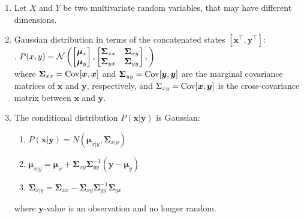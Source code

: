 \begin{enumerate}
    \item Let $X$ and $Y$ be two multivariate random variables, that may have different dimensions.
    \hfill \cite{mfml/book/mml/Deisenroth-Faisal-Ong}

    \item Gaussian distribution in terms of the concatenated states $[\bm{x}^\top, \bm{y}^\top]$:
    \hfill \cite{mfml/book/mml/Deisenroth-Faisal-Ong}
    \\[0.2cm]
    .\hfill
    $
        P(x, y)
        = \mathcal{N}\left(
            \begin{bmatrix}
                \bm{\mu}_x \\ \bm{\mu}_y
            \end{bmatrix},
            \begin{bmatrix}
                \bm{\Sigma}_{xx} & \bm{\Sigma}_{xy} \\ 
                \bm{\Sigma}_{yx} & \bm{\Sigma}_{yy} \\ 
            \end{bmatrix},
        \right)
    $
    \hfill \cite{mfml/book/mml/Deisenroth-Faisal-Ong}
    \\[0.2cm]
    where $\bm{\Sigma}_{xx} = \text{Cov}[\bm{x}, \bm{x}]$ and $\bm{\Sigma}_{yy} = \text{Cov}[\bm{y}, \bm{y}]$ are the marginal covariance matrices of $\bm{x}$ and $\bm{y}$, respectively, and $\Sigma_{xy} = \text{Cov}[\bm{x}, \bm{y}]$ is the cross-covariance matrix between $\bm{x}$ and $\bm{y}$.
    \hfill \cite{mfml/book/mml/Deisenroth-Faisal-Ong}

    \item The conditional distribution $P(\bm{x} | \bm{y})$ is Gaussian:
    \hfill \cite{mfml/book/mml/Deisenroth-Faisal-Ong}
    \begin{multicols}{2}
    \begin{enumerate}
        \item $ P(\bm{x} | \bm{y}) = N (\bm{\mu}_{x | y} , \bm{\Sigma}_{x | y}) $
        \hfill \cite{mfml/book/mml/Deisenroth-Faisal-Ong}

        \item $ \bm{\mu}_{x | y} = \bm{\mu}_x + \bm{\Sigma}_{xy} \bm{\Sigma}^{-1} _{yy} (\bm{y} - \bm{\mu}_y )  $
        \hfill \cite{mfml/book/mml/Deisenroth-Faisal-Ong}

        \item $ \bm{\Sigma}_{x | y} = \bm{\Sigma}_{xx} - \bm{\Sigma}_{xy} \bm{\Sigma}^{-1}_{yy} \bm{\Sigma}_{yx} $
        \hfill \cite{mfml/book/mml/Deisenroth-Faisal-Ong}
    \end{enumerate}
    \end{multicols}
    where $\bm{y}$-value is an observation and no longer random.
    \hfill \cite{mfml/book/mml/Deisenroth-Faisal-Ong}


\end{enumerate}
